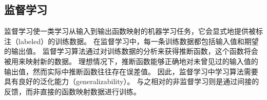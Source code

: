 
\subsection{监督学习}

监督学习使一类学习从输入到输出函数映射的机器学习任务，它会显式地提供被标注（labeled）的训练数据\cite{chapelle2009semi, moller1993scaled, zhu2005semi}。
在监督学习中，每一条训练数据都包括输入值和期望的输出值。
监督学习算法通过对训练数据的分析来获得推断函数，这个函数将会被用来映射新的数据。
理想情况下，推断函数能够正确地对未曾见过的输入值的输出值，然而实际中推断函数往往存在误差值。
因此，监督学习中学习算法需要具有良好的泛化能力\cite{kawaguchi2017generalization, neyshabur2017exploring, zhang2016understanding}（generalizability）。
与之相对的非监督学习则是通过间接的反馈，而非直接的函数映射数据进行{\model}训练\cite{ghahramani2003unsupervised, dayan1999unsupervised, sathya2013comparison}。


